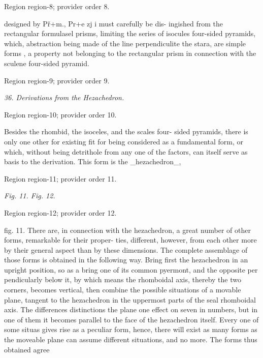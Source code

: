 \documentclass[11pt]{article}
\begin{document}
{\scriptsize\color{gray} Region region-8; provider order 8.\par}
\medskip

designed by Př+m., Pr+e zj i must carefully be dis- ingished from the rectangular formulasel prisms, limiting the series of isocules four-sided pyramids, which, abstraction being made of the line perpendiculite the stara, are simple forms , a property not belonging to the rectangular prism in connection with the sculene four-sided pyramid.
\par

{\scriptsize\color{gray} Region region-9; provider order 9.\par}
\medskip

{\small\itshape 36. Derivations from the Hezachedron.\par}

{\scriptsize\color{gray} Region region-10; provider order 10.\par}
\medskip

Besides the rhombid, the isoceles, and the scales four- sided pyramids, there is only one other for existing fit for being considered as a fundamental form, or which, without being detrithole from any one of the factors, can itself serve as basis to the derivation. This form is the \_hezachedron\_,
\par

{\scriptsize\color{gray} Region region-11; provider order 11.\par}
\medskip

{\small\itshape Fig. 11. Fig. 12.\par}

{\scriptsize\color{gray} Region region-12; provider order 12.\par}
\medskip

fig. 11. There are, in connection with the hezachedron, a great number of other forms, remarkable for their proper- ties, different, however, from each other more by their general aspect than by these dimensions. The complete assemblage of those forms is obtained in the following way. Bring first the hezachedron in an upright position, so as a bring one of its common pyermont, and the opposite per pendicularly below it, by which means the rhomboidal axis, thereby the two corners, becomes vertical, then combine the possible situations of a movable plane, tangent to the hezachedron in the uppermost parts of the seal rhomboidal axis. The differences distinctions the plane one effect on seven in numbers, but in one of them it becomes parallel to the face of the hezachedron itself. Every one of some situas gives rise as a peculiar form, hence, there will exist as many forms as the moveable plane can assume different situations, and no more. The forms thus obtained agree
\par
\end{document}
